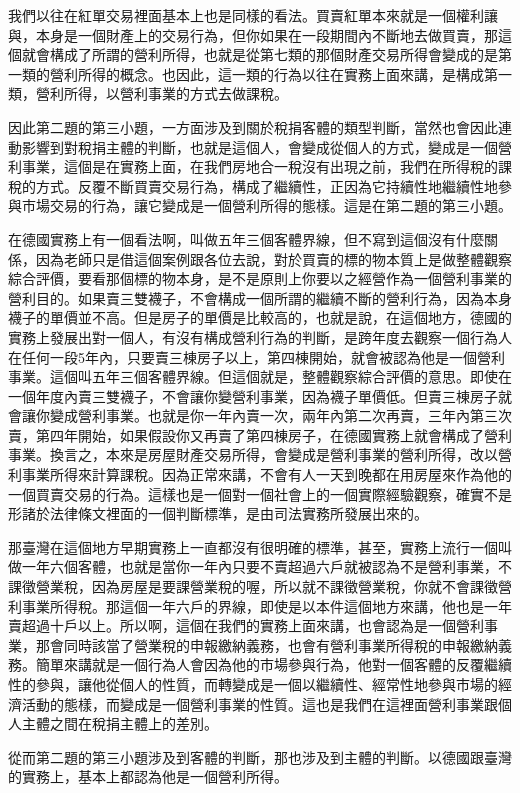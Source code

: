 \documentclass[oneside,sub3section]{ctexbook}
\begin{document}
我們以往在紅單交易裡面基本上也是同樣的看法。買賣紅單本來就是一個權利讓與，本身是一個財產上的交易行為，但你如果在一段期間內不斷地去做買賣，那這個就會構成了所謂的營利所得，也就是從第七類的那個財產交易所得會變成的是第一類的營利所得的概念。也因此，這一類的行為以往在實務上面來講，是構成第一類，營利所得，以營利事業的方式去做課稅。

因此第二題的第三小題，一方面涉及到關於稅捐客體的類型判斷，當然也會因此連動影響到對稅捐主體的判斷，也就是這個人，會變成從個人的方式，變成是一個營利事業，這個是在實務上面，在我們房地合一稅沒有出現之前，我們在所得稅的課稅的方式。反覆不斷買賣交易行為，構成了繼續性，正因為它持續性地繼續性地參與市場交易的行為，讓它變成是一個營利所得的態樣。這是在第二題的第三小題。

在德國實務上有一個看法啊，叫做五年三個客體界線，但不寫到這個沒有什麼關係，因為老師只是借這個案例跟各位去說，對於買賣的標的物本質上是做整體觀察綜合評價，要看那個標的物本身，是不是原則上你要以之經營作為一個營利事業的營利目的。如果賣三雙襪子，不會構成一個所謂的繼續不斷的營利行為，因為本身襪子的單價並不高。但是房子的單價是比較高的，也就是說，在這個地方，德國的實務上發展出對一個人，有沒有構成營利行為的判斷，是跨年度去觀察一個行為人在任何一段5年內，只要賣三棟房子以上，第四棟開始，就會被認為他是一個營利事業。這個叫五年三個客體界線。但這個就是，整體觀察綜合評價的意思。即使在一個年度內賣三雙襪子，不會讓你變營利事業，因為襪子單價低。但賣三棟房子就會讓你變成營利事業。也就是你一年內賣一次，兩年內第二次再賣，三年內第三次賣，第四年開始，如果假設你又再賣了第四棟房子，在德國實務上就會構成了營利事業。換言之，本來是房屋財產交易所得，會變成是營利事業的營利所得，改以營利事業所得來計算課稅。因為正常來講，不會有人一天到晚都在用房屋來作為他的一個買賣交易的行為。這樣也是一個對一個社會上的一個實際經驗觀察，確實不是形諸於法律條文裡面的一個判斷標準，是由司法實務所發展出來的。

那臺灣在這個地方早期實務上一直都沒有很明確的標準，甚至，實務上流行一個叫做一年六個客體，也就是當你一年內只要不賣超過六戶就被認為不是營利事業，不課徵營業稅，因為房屋是要課營業稅的喔，所以就不課徵營業稅，你就不會課徵營利事業所得稅。那這個一年六戶的界線，即使是以本件這個地方來講，他也是一年賣超過十戶以上。所以啊，這個在我們的實務上面來講，也會認為是一個營利事業，那會同時該當了營業稅的申報繳納義務，也會有營利事業所得稅的申報繳納義務。簡單來講就是一個行為人會因為他的市場參與行為，他對一個客體的反覆繼續性的參與，讓他從個人的性質，而轉變成是一個以繼續性、經常性地參與市場的經濟活動的態樣，而變成是一個營利事業的性質。這也是我們在這裡面營利事業跟個人主體之間在稅捐主體上的差別。

從而第二題的第三小題涉及到客體的判斷，那也涉及到主體的判斷。以德國跟臺灣的實務上，基本上都認為他是一個營利所得。
\end{document}
